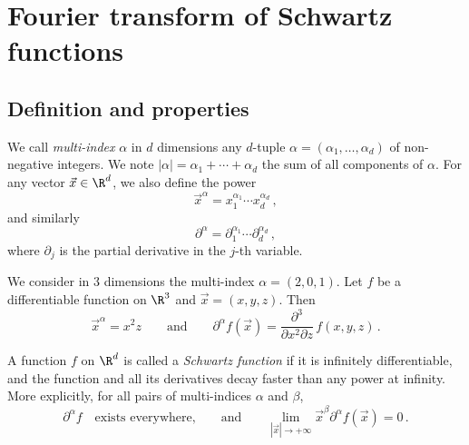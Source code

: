 \section{Fourier transform of Schwartz functions}
\subsection{Definition and properties}
\begin{definition}
  We call \emph{multi-index} $\alpha$ in $d$ dimensions any $d$-tuple
  $\alpha=(\alpha_1,\dots,\alpha_d)$ of  non-negative integers. We note
  $|\alpha|=\alpha_1+\cdots+\alpha_d$ the sum of all components of $\alpha$.
  For any vector $\vec{x}\in\R^d$, we also define the power
  \begin{equation}
    \vec{x}^\alpha=x_1^{\alpha_1}\cdots x_d^{\alpha_d}\,,
  \end{equation}
  and similarly
  \begin{equation}
    \partial^{\alpha}=\partial_1^{\alpha_1}\cdots\partial_d^{\alpha_d}\,,
  \end{equation}
  where $\partial_j$ is the partial derivative in the $j$-th variable.
\end{definition}
\begin{example}
  We consider in $3$ dimensions the multi-index $\alpha=(2,0,1)$. Let $f$ be a
  differentiable function on $\R^3$ and $\vec{x}=(x,y,z)$. Then
  \begin{equation}
    \vec{x}^\alpha=x^2z\qquad\text{and}\qquad\partial^\alpha
    f(\vec{x})=\frac{\partial^3}{\partial x^2\partial z}\,f(x,y,z)\,.
  \end{equation}
\end{example}
\begin{definition}
  \label{def:schwartz-fn}
  A function $f$ on $\R^d$ is called a \emph{Schwartz function} if it is infinitely
  differentiable, and the function and all its derivatives decay faster than any power
  at infinity. More explicitly, for all pairs of multi-indices $\alpha$ and $\beta$,
  \begin{equation}
    \partial^{\alpha}f\quad\text{exists everywhere,}\qquad\text{and}\qquad
    \lim_{|\vec{x}|\to+\infty}\vec{x}^\beta\partial^{\alpha}f(\vec{x})=0\,.
  \end{equation}
\end{definition}
